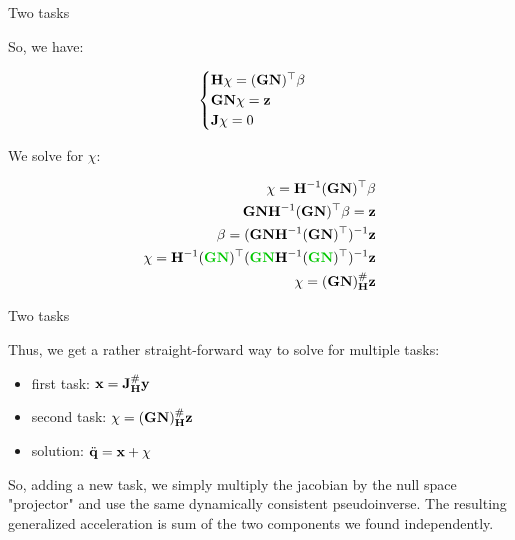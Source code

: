 \documentclass{beamer}
\newcommand{\iH} {\mathbf{H}^{-1}}
\begin{document}
\begin{frame}{Two tasks}
	\begin{flushleft}
		
		So, we have:
		
		\begin{equation}
			\begin{cases}
				\mathbf{H} \chi = (\mathbf{G}\mathbf{N})^\top \beta\\
				\mathbf{G}\mathbf{N} \chi = \mathbf{z} \\
				\mathbf{J} \chi = 0
			\end{cases}
		\end{equation}
		
		We solve for $\chi$:
		
		\begin{align}
			\chi = \iH (\bo{G}\bo{N})\T \beta \\
			\bo{G}\bo{N} \iH (\bo{G}\bo{N})\T \beta = \bo{z} \\
			\beta = (\bo{G}\bo{N} \iH (\bo{G}\bo{N})\T)^{-1}\bo{z} \\
			\chi = \iH ( \textcolor{mygreen}{\bo{G}\bo{N}} )\T (\textcolor{mygreen}{\bo{G}\bo{N}} \iH (\textcolor{mygreen}{\bo{G}\bo{N}})\T)^{-1}\bo{z} \\
			\chi = (\bo{G}\bo{N})_\bo{H}^\# \bo{z}
		\end{align}
		
	\end{flushleft}
\end{frame}



\begin{frame}{Two tasks}
	\begin{flushleft}
		
		Thus, we get a rather straight-forward way to solve for multiple tasks:
		
		\begin{itemize}
			\item first task: $\mathbf{x} = \mathbf{J}^\#_{\mathbf{H}}  \mathbf{y}$
			\item second task: $\chi = (\mathbf{G}\mathbf{N})_{\mathbf{H}}^\# \mathbf{z}$
			\item solution: $\ddot{\mathbf{q}} = \mathbf{x} + \chi$
		\end{itemize}
		
		\bigskip
		
		So, adding a new task, we simply multiply the jacobian by the null space "projector" and use the same dynamically consistent pseudoinverse. The resulting generalized acceleration is sum of the two components we found independently.
		
	\end{flushleft}
\end{frame}
\end{document}
